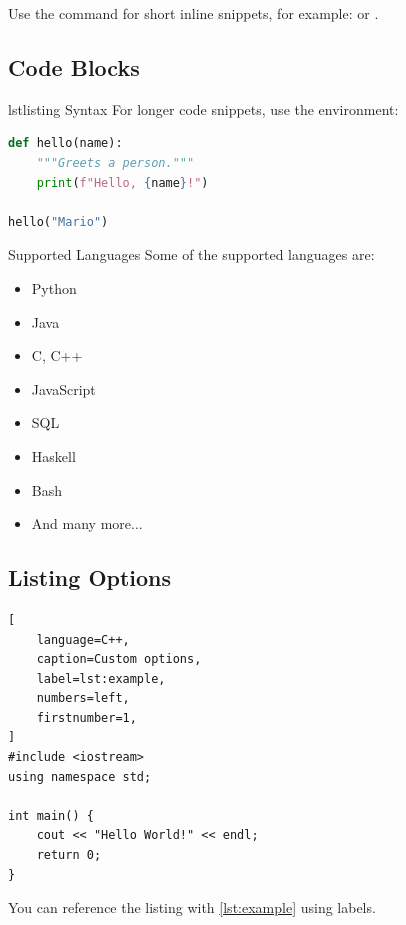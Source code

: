 \documentclass[]{csnotes}
\begin{document}
Use the command  for short inline snippets,
for example:  or .

\subsection{Code Blocks}

\begin{example}{lstlisting Syntax}
For longer code snippets, use the  environment:
\end{example}

\begin{lstlisting}[language=Python, caption=Basic example]
def hello(name):
    """Greets a person."""
    print(f"Hello, {name}!")

hello("Mario")
\end{lstlisting}

\begin{note}{Supported Languages}
Some of the supported languages are:
\begin{itemize}
    \item Python
    \item Java
    \item C, C++
    \item JavaScript
    \item SQL
    \item Haskell
    \item Bash
    \item And many more...
\end{itemize}
\end{note}

\subsection{Listing Options}

\begin{lstlisting}[
    language=C++,
    caption=Custom options,
    label=lst:example,
    numbers=left,
    firstnumber=1,
]
#include <iostream>
using namespace std;

int main() {
    cout << "Hello World!" << endl;
    return 0;
}
\end{lstlisting}

You can reference the listing with \ref{lst:example} using labels.

\newpage
\end{document}
